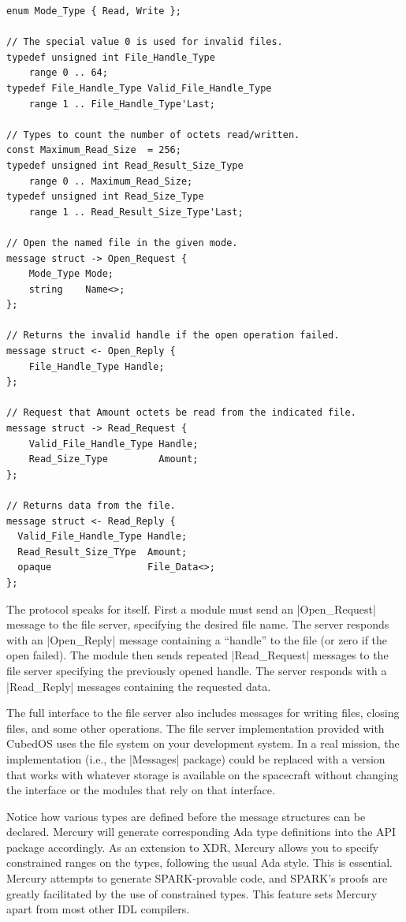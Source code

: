 \begin{verbatim}
enum Mode_Type { Read, Write };

// The special value 0 is used for invalid files.
typedef unsigned int File_Handle_Type
    range 0 .. 64;
typedef File_Handle_Type Valid_File_Handle_Type
    range 1 .. File_Handle_Type'Last;

// Types to count the number of octets read/written.
const Maximum_Read_Size  = 256;
typedef unsigned int Read_Result_Size_Type
    range 0 .. Maximum_Read_Size;
typedef unsigned int Read_Size_Type
    range 1 .. Read_Result_Size_Type'Last;

// Open the named file in the given mode.
message struct -> Open_Request {
    Mode_Type Mode;
    string    Name<>;
};

// Returns the invalid handle if the open operation failed.
message struct <- Open_Reply {
    File_Handle_Type Handle;
};

// Request that Amount octets be read from the indicated file.
message struct -> Read_Request {
    Valid_File_Handle_Type Handle;
    Read_Size_Type         Amount;
};

// Returns data from the file.
message struct <- Read_Reply {
  Valid_File_Handle_Type Handle;
  Read_Result_Size_TYpe  Amount;
  opaque                 File_Data<>;
};
\end{verbatim}

The protocol speaks for itself. First a module must send an |Open_Request| message to the file
server, specifying the desired file name. The server responds with an |Open_Reply| message
containing a ``handle'' to the file (or zero if the open failed). The module then sends repeated
|Read_Request| messages to the file server specifying the previously opened handle. The server
responds with a |Read_Reply| messages containing the requested data.

The full interface to the file server also includes messages for writing files, closing files,
and some other operations. The file server implementation provided with CubedOS uses the file
system on your development system. In a real mission, the implementation (i.e., the |Messages|
package) could be replaced with a version that works with whatever storage is available on the
spacecraft without changing the interface or the modules that rely on that interface.

Notice how various types are defined before the message structures can be declared. Mercury will
generate corresponding Ada type definitions into the API package accordingly. As an extension to
XDR, Mercury allows you to specify constrained ranges on the types, following the usual Ada
style. This is essential. Mercury attempts to generate SPARK-provable code, and SPARK's proofs
are greatly facilitated by the use of constrained types. This feature sets Mercury apart from
most other IDL compilers.

